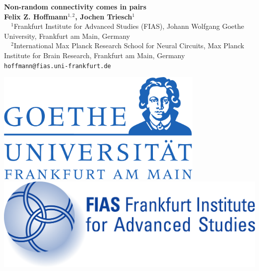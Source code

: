 \documentclass[a0,portrait]{a0poster}
\begin{document}

\vspace{-5cm}

\begin{minipage}[b]{0.75\linewidth}
  \veryHuge \textbf{Non-random connectivity comes in pairs} \color{Black}\\[1.5cm] 
  \huge \textbf{Felix Z. Hoffmann$^{1,2}$, Jochen Triesch$^1$}\\[0.5cm] %
\large $\quad ^1$Frankfurt Institute for Advanced Studies (FIAS), Johann Wolfgang Goethe University, Frankfurt am Main, Germany\\[0.2cm] %
$\quad ^2$International Max Planck Research School for Neural Circuits, Max Planck Institute for Brain Research, Frankfurt am Main, Germany\\[0.4cm]
\Large \texttt{hoffmann@fias.uni-frankfurt.de}\\
\end{minipage}
%
\begin{minipage}[b]{0.25\linewidth}
  \centering
  
  \includegraphics[width=10cm]{goethe-logo.pdf}\\
  \vspace{2cm}
  \includegraphics[width=15cm]{FIAS-logo.pdf}\\
  \vspace{2cm}
  
\end{minipage}
\end{document}
